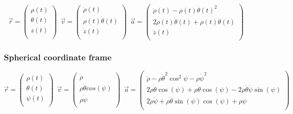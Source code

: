 \documentclass[10pt,a4paper]{scrartcl}
\begin{document}
\begin{multicols*}{2}
\begin{equation*}
{\vec{r}=\begin{pmatrix} \rho(t) \\ \theta(t) \\ z(t) \\ \end{pmatrix}} 
\enspace
{\vec{v}=\begin{pmatrix} \dot{\rho}(t)  \\ \rho(t)\dot{\theta}(t) \\ \dot{z}(t) \\ \end{pmatrix}} 
\enspace
{\vec{a}=\begin{pmatrix} \ddot{\rho}(t)-\rho(t)\dot{\theta}(t)^2 \\ 2 \dot{\rho}(t)\dot{\theta}(t)+\rho(t)\ddot{\theta}(t) \\ \ddot{z}(t) \\ \end{pmatrix}}
\end{equation*}

\subsubsection{Spherical coordinate frame}

\begin{center}
\def\svgwidth{\linewidth}

\end{center}

\begin{equation*}
{\vec{r}=\begin{pmatrix} \rho(t) \\ \theta (t) \\ \psi (t) \\ \end{pmatrix}}   
\enspace
{\vec{v}=\begin{pmatrix} \dot{\rho} \\ \rho \dot{\theta} cos(\psi) \\ \rho \dot{\psi} \\ \end{pmatrix}}   
\enspace
{\vec{a}=\begin{pmatrix}  \ddot{\rho}-\rho \dot{\theta}^2 \cos^2 \psi - \rho \dot{\psi}^2  \\ 2 \dot{\rho} \dot{\theta} \cos(\psi) + \rho \ddot{\theta} \cos(\psi) - 2 \rho \dot{\theta} \dot{\psi} \sin(\psi)  \\ 2 \dot{\rho} \dot{\psi} + \rho \dot{\theta} \sin( \psi) \cos( \psi) + \rho \ddot{\psi} \\ \end{pmatrix}}
\end{equation*}


\end{multicols*}
\end{document}
